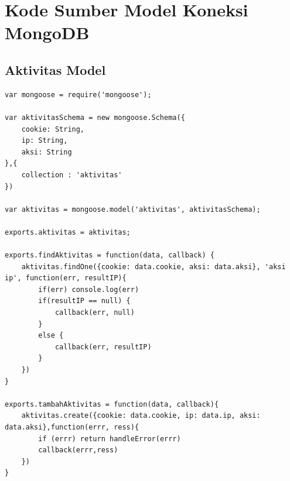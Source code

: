 \documentclass{ta-its}
\begin{document}
	\chapter{Kode Sumber Model Koneksi MongoDB}
		\section{Aktivitas Model}
			\begin{lstlisting}[frame=single,tabsize=2,breaklines,caption={Aktivitas Model untuk Koleksi Aktivitas},label=aktivitasModel]	
var mongoose = require('mongoose');

var aktivitasSchema = new mongoose.Schema({
	cookie: String,
	ip: String,
	aksi: String
},{
	collection : 'aktivitas'
})

var aktivitas = mongoose.model('aktivitas', aktivitasSchema);

exports.aktivitas = aktivitas;

exports.findAktivitas = function(data, callback) {
	aktivitas.findOne({cookie: data.cookie, aksi: data.aksi}, 'aksi ip', function(err, resultIP){
		if(err) console.log(err)
		if(resultIP == null) {
			callback(err, null)
		}
		else {
			callback(err, resultIP)
		}
	})
}

exports.tambahAktivitas = function(data, callback){
	aktivitas.create({cookie: data.cookie, ip: data.ip, aksi: data.aksi},function(errr, ress){
		if (errr) return handleError(errr)
		callback(errr,ress)
	})
}
			
			\end{lstlisting}
\end{document}
